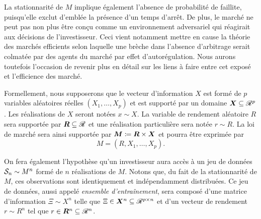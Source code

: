 La stationnarité de $M$ implique également l'absence de probabilité de faillite,
puisqu'elle exclut d'emblée la présence d'un temps d'arrêt. De plus, le marché ne peut pas
non plus être conçu comme un environnement adversariel qui réagirait aux décisions de
l'investisseur. Ceci vient notamment mettre en cause la théorie des marchés efficients
selon laquelle une brèche dans l'absence d'arbitrage serait colmatée par des agents du
marché par effet d'autorégulation. Nous aurons toutefois l'occasion de revenir plus en
détail sur les liens à faire entre cet exposé et l'efficience des marché.

Formellement, nous supposerons que le vecteur d'information $X$ est formé de $p$ variables
aléatoires réelles $(X_1,\ldots,X_p)$ et est supporté par un domaine $\X \subseteq \Re^p$. Les
réalisations de $X$ seront notées $x \sim X$. La variable de rendement aléatoire $R$ sera
supportée par $\R \subseteq \Re$ et une réalisation particulière sera notée $r \sim R$.  La loi de
marché sera ainsi supportée par $\M \coloneq \R \times \X$ et pourra être exprimée par
\begin{equation}
  M = (R,X_1, \ldots, X_p).
\end{equation}

On fera également l'hypothèse qu'un investisseur aura accès à un jeu de données
$\S_n \sim M^n$ formé de $n$ réalisations de $M$. Notons que, du fait de la stationnarité de
$M$, ces observations sont identiquement et indépendamment distribuées. Ce jeu de données,
aussi appelé \textit{ensemble d'entraînement}, sera composé d'une matrice d'information
$\Xi \sim X^n$ telle que $\Xi \in \X^n \subseteq \Re^{p \times n}$ et d'un vecteur de rendement
$r \sim R^n$ tel que $r \in \R^n \subseteq \Re^n$.


